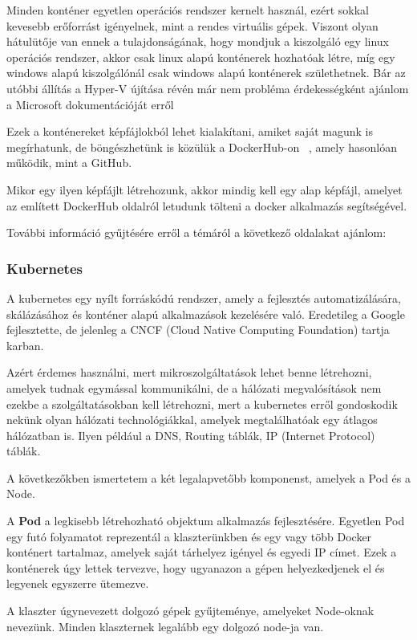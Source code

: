 \documentclass[a4paper,oneside]{article}
\begin{document}
Minden konténer egyetlen operációs rendszer kernelt használ, ezért sokkal 
kevesebb erőforrást igényelnek, mint a rendes virtuális gépek. Viszont 
olyan hátulütője van ennek a tulajdonságának, hogy mondjuk a kiszolgáló 
egy linux operációs rendszer, akkor csak linux alapú konténerek hozhatóak 
létre, míg egy windows alapú kiszolgálónál csak windows alapú konténerek 
születhetnek. Bár az utóbbi állítás a Hyper-V újítása révén már nem probléma 
érdekességként ajánlom a Microsoft dokumentációját erről ~\cite{linuxwindows}

Ezek a konténereket képfájlokból lehet kialakítani, amiket saját magunk is 
megírhatunk, de böngészhetünk is közülük a DockerHub-on ~\cite{dockerhub}, 
amely hasonlóan működik, mint a GitHub. 

Mikor egy ilyen képfájlt létrehozunk, akkor mindig kell egy alap képfájl, 
amelyet az említett DockerHub oldalról letudunk tölteni a docker alkalmazás 
segítségével. 

További információ gyűjtésére erről a témáról a következő oldalakat ajánlom:
~\cite{dockeroff} ~\cite{dockerwiki}

\subsubsection{Kubernetes}
A kubernetes egy nyílt forráskódú rendszer, amely a fejlesztés automatizálására, 
skálázásához és konténer alapú alkalmazások kezelésére való. Eredetileg a 
Google fejlesztette, de jelenleg a CNCF (Cloud Native Computing Foundation) 
tartja karban.

Azért érdemes használni, mert mikroszolgáltatások lehet benne létrehozni, amelyek 
tudnak egymással kommunikálni, de a hálózati megvalósítások nem ezekbe a szolgáltatásokban 
kell létrehozni, mert a kubernetes erről gondoskodik nekünk olyan hálózati technológiákkal, 
amelyek megtalálhatóak egy átlagos hálózatban is. Ilyen például a DNS, Routing táblák,
IP (Internet Protocol) táblák.

A következőkben ismertetem a két legalapvetőbb komponenst, amelyek a Pod és a Node. 

A \textbf{Pod} a legkisebb létrehozható objektum alkalmazás fejlesztésére. Egyetlen 
Pod egy futó folyamatot reprezentál a klaszterünkben és egy vagy több Docker 
konténert tartalmaz, amelyek saját tárhelyez igényel és egyedi IP címet. 
Ezek a konténerek úgy lettek tervezve, hogy ugyanazon a gépen helyezkedjenek el 
és legyenek egyszerre ütemezve. 

A klaszter úgynevezett dolgozó gépek gyűjteménye, amelyeket Node-oknak nevezünk. 
Minden klaszternek legalább egy dolgozó node-ja van. 
\end{document}
